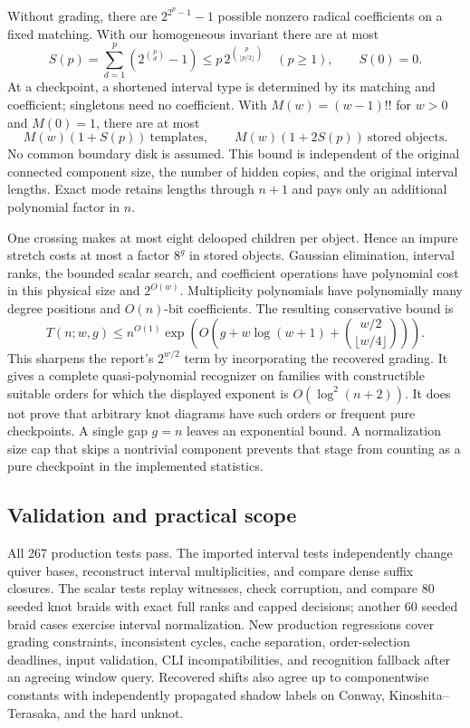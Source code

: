 Without grading, there are $2^{2^p-1}-1$ possible nonzero radical
coefficients on a fixed matching. With our homogeneous invariant there are
at most
\[
 S(p)=\sum_{d=1}^p\left(2^{\binom pd}-1\right)
 \le p\,2^{\binom p{\lfloor p/2\rfloor}}\quad(p\ge1),
 \qquad S(0)=0.
\]
At a checkpoint, a shortened interval type is determined by its matching
and coefficient; singletons need no coefficient. With
$M(w)=(w-1)!!$ for $w>0$ and $M(0)=1$, there are at most
\[
 M(w)(1+S(p))\ \text{templates},\qquad
 M(w)(1+2S(p))\ \text{stored objects}.
\]
No common boundary disk is assumed. This bound is independent of the
original connected component size, the number of hidden copies, and the
original interval lengths. Exact mode retains lengths through $n+1$ and
pays only an additional polynomial factor in $n$.

One crossing makes at most eight delooped children per object. Hence an
impure stretch costs at most a factor $8^g$ in stored objects. Gaussian
elimination, interval ranks, the bounded scalar search, and coefficient
operations have polynomial cost in this physical size and $2^{O(w)}$.
Multiplicity polynomials have polynomially many degree positions and
$O(n)$-bit coefficients. The resulting conservative bound is
\begin{equation}\label{eq:graded-checkpoint-cost}
 T(n;w,g)\le n^{O(1)}
 \exp\left(O\left(g+w\log(w+1)+
                  \binom{w/2}{\lfloor w/4\rfloor}\right)\right).
\end{equation}
This sharpens the report's $2^{w/2}$ term by incorporating the recovered
grading. It gives a complete quasi-polynomial recognizer on families with
constructible suitable orders for which the displayed exponent is
$O(\log^2(n+2))$. It does not prove that arbitrary knot diagrams have such
orders or frequent pure checkpoints. A single gap $g=n$ leaves an
exponential bound. A normalization size cap that skips a nontrivial
component prevents that stage from counting as a pure checkpoint in the
implemented statistics.

\subsection{Validation and practical scope}
All 267 production tests pass. The imported interval tests independently
change quiver bases, reconstruct interval multiplicities, and compare dense
suffix closures. The scalar tests replay witnesses, check corruption, and
compare 80 seeded knot braids with exact full ranks and capped decisions;
another 60 seeded braid cases exercise interval normalization. New production
regressions cover grading constraints, inconsistent cycles, cache separation,
order-selection deadlines, input validation, CLI incompatibilities, and
recognition fallback after an agreeing window query. Recovered shifts also
agree up to componentwise constants with independently propagated shadow
labels on Conway, Kinoshita--Terasaka, and the hard unknot.

